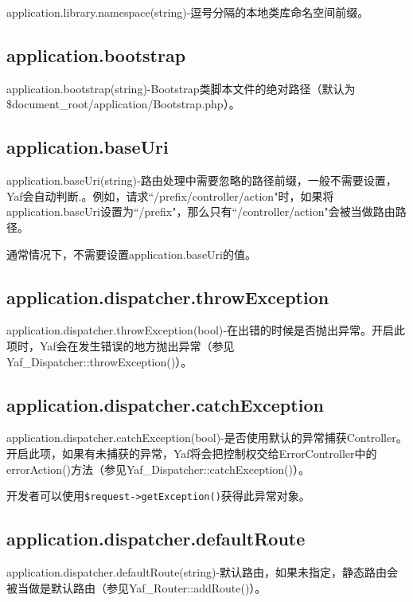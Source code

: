 application.library.namespace(string)-逗号分隔的本地类库命名空间前缀。


\subsection{application.bootstrap}

application.bootstrap(string)-Bootstrap类脚本文件的绝对路径（默认为\$document\_root/application/Bootstrap.php）。

\subsection{application.baseUri}

application.baseUri(string)-路由处理中需要忽略的路径前缀，一般不需要设置，Yaf会自动判断.。例如，请求``/prefix/controller/action"时，如果将application.baseUri设置为``/prefix"，那么只有``/controller/action"会被当做路由路径。

通常情况下，不需要设置application.baseUri的值。

\subsection{application.dispatcher.throwException}

application.dispatcher.throwException(bool)-在出错的时候是否抛出异常。开启此项时，Yaf会在发生错误的地方抛出异常（参见Yaf\_Dispatcher::throwException()）。


\subsection{application.dispatcher.catchException}


application.dispatcher.catchException(bool)-是否使用默认的异常捕获Controller。开启此项，如果有未捕获的异常，Yaf将会把控制权交给ErrorController中的errorAction()方法（参见Yaf\_Dispatcher::catchException()）。

开发者可以使用\texttt{\$request->getException()}获得此异常对象。



\subsection{application.dispatcher.defaultRoute}

application.dispatcher.defaultRoute(string)-默认路由，如果未指定，静态路由会被当做是默认路由（参见Yaf\_Router::addRoute()）。

